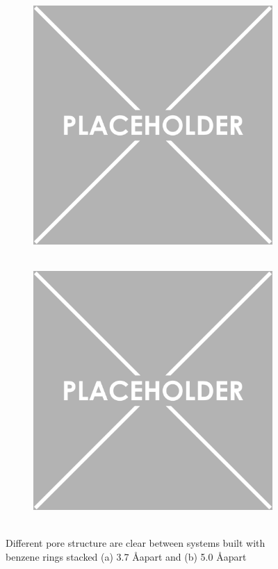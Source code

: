 \documentclass{article}
\newcommand{\angstrom}{\textup{\AA}}
\begin{document}
	\begin{figure}
	\centering
	\begin{subfigure}{.45\textwidth}
		\centering
		\includegraphics[width=\linewidth]{placeholder.png}
		\caption{~\label{fig:phaseA}}
	\end{subfigure}
	\begin{subfigure}{.45\textwidth}
		\includegraphics[width=\linewidth]{placeholder.png}
		\centering
		\caption{~\label{fig:phaseB}}
	\end{subfigure}
	\caption{Different pore structure are clear between systems built with benzene rings stacked (a) 3.7 \angstrom apart and (b) 5.0 \angstrom apart}
	\label{fig:porestructures}
	\end{figure}
\end{document}
